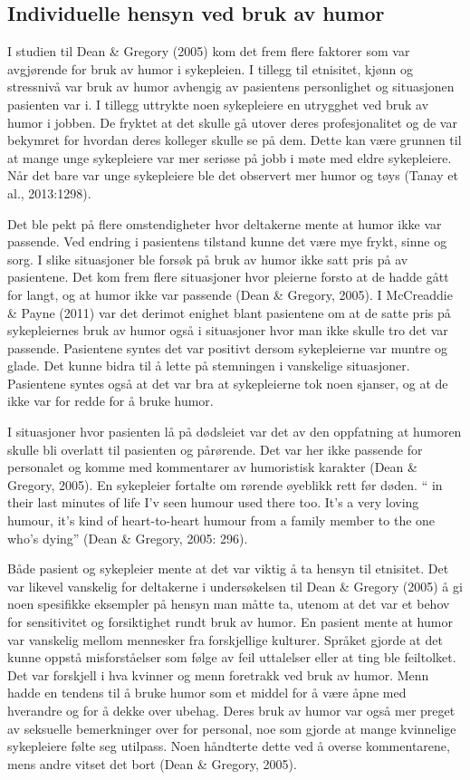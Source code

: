 \subsection{Individuelle hensyn ved bruk av humor}

I studien til Dean \&{} Gregory (2005) kom det frem flere faktorer som var
avgjørende for bruk av humor i sykepleien. I tillegg til etnisitet, kjønn og
stressnivå  var bruk av humor avhengig av pasientens personlighet og
situasjonen pasienten var i. I tillegg uttrykte noen sykepleiere en utrygghet
ved bruk av humor i jobben. De fryktet at det skulle gå utover deres
profesjonalitet og de var bekymret for hvordan deres kolleger skulle se på dem.
Dette kan være grunnen til at mange unge sykepleiere var mer seriøse på jobb i
møte med eldre sykepleiere. Når det bare var unge sykepleiere ble det observert
mer humor og tøys (Tanay et al., 2013:1298).

Det ble pekt på flere omstendigheter hvor deltakerne mente at humor ikke var
passende. Ved endring i pasientens tilstand kunne det være mye frykt, sinne og
sorg. I slike situasjoner ble forsøk på bruk av humor ikke satt pris på av
pasientene. Det kom frem flere situasjoner hvor pleierne forsto at de hadde
gått for langt, og at humor ikke var passende (Dean \&{} Gregory, 2005). I
McCreaddie \&{} Payne (2011) var det derimot enighet blant pasientene om at de
satte pris på sykepleiernes bruk av humor også i situasjoner hvor man ikke
skulle tro det var passende. Pasientene syntes det var positivt dersom
sykepleierne var muntre og glade. Det kunne bidra til å lette på stemningen i
vanskelige situasjoner. Pasientene syntes også at det var bra at sykepleierne
tok noen sjanser, og at de ikke var for redde for å bruke humor.

I situasjoner hvor pasienten lå på dødsleiet var det av den oppfatning at
humoren skulle bli overlatt til pasienten og pårørende. Det var her ikke
passende for personalet og komme med kommentarer av humoristisk karakter (Dean
\&{} Gregory, 2005). En sykepleier fortalte om rørende øyeblikk rett før døden.  “
in their last minutes of life I’v seen humour used there too. It’s a very
loving humour, it’s kind of heart-to-heart humour from a family member to the
one who’s dying” (Dean \&{} Gregory, 2005: 296).

Både pasient og sykepleier mente at det var viktig å ta hensyn til etnisitet.
Det var likevel vanskelig for deltakerne i undersøkelsen til Dean \&{} Gregory
(2005) å gi noen spesifikke eksempler på hensyn man måtte ta, utenom at det var
et behov for sensitivitet og forsiktighet rundt bruk av humor. En pasient mente
at humor var vanskelig mellom mennesker fra forskjellige kulturer. Språket
gjorde at det kunne oppstå misforståelser som følge av feil uttalelser eller at
ting ble feiltolket.  Det var forskjell i hva kvinner og menn foretrakk ved
bruk av humor. Menn hadde en tendens til å bruke humor som et middel for å være
åpne med hverandre og for å dekke over ubehag. Deres bruk av humor var også mer
preget av seksuelle bemerkninger over for personal, noe som gjorde at mange
kvinnelige sykepleiere følte seg utilpass. Noen håndterte dette ved å overse
kommentarene, mens andre vitset det bort (Dean \&{} Gregory, 2005).

